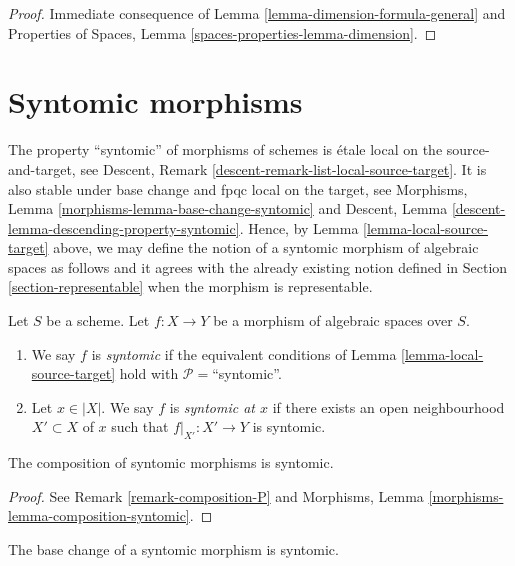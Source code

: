\begin{proof}
Immediate consequence of Lemma \ref{lemma-dimension-formula-general}
and Properties of Spaces, Lemma \ref{spaces-properties-lemma-dimension}.
\end{proof}







\section{Syntomic morphisms}
\label{section-syntomic}

\noindent
The property ``syntomic'' of morphisms of schemes is
\'etale local on the source-and-target, see
Descent, Remark \ref{descent-remark-list-local-source-target}.
It is also stable under base change and fpqc local on the target, see
Morphisms, Lemma \ref{morphisms-lemma-base-change-syntomic} and
Descent, Lemma \ref{descent-lemma-descending-property-syntomic}.
Hence, by
Lemma \ref{lemma-local-source-target}
above, we may define the notion of a syntomic morphism of algebraic spaces as
follows and it agrees with the already existing notion defined in
Section \ref{section-representable}
when the morphism is representable.

\begin{definition}
\label{definition-syntomic}
Let $S$ be a scheme.
Let $f : X \to Y$ be a morphism of algebraic spaces over $S$.
\begin{enumerate}
\item We say $f$ is {\it syntomic} if the equivalent conditions of
Lemma \ref{lemma-local-source-target}
hold with $\mathcal{P} =$``syntomic''.
\item Let $x \in |X|$. We say $f$ is {\it syntomic at $x$} if
there exists an open neighbourhood $X' \subset X$ of $x$ such
that $f|_{X'} : X' \to Y$ is syntomic.
\end{enumerate}
\end{definition}

\begin{lemma}
\label{lemma-composition-syntomic}
The composition of syntomic morphisms is syntomic.
\end{lemma}

\begin{proof}
See Remark \ref{remark-composition-P} and
Morphisms, Lemma \ref{morphisms-lemma-composition-syntomic}.
\end{proof}

\begin{lemma}
\label{lemma-base-change-syntomic}
The base change of a syntomic morphism is syntomic.
\end{lemma}

